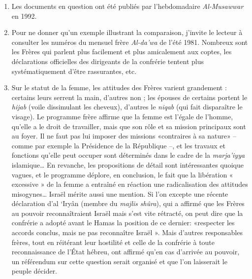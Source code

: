 \begin{enumerate}
\def\labelenumi{\arabic{enumi}.}
\setcounter{enumi}{43}
\item
   
  Les documents en question ont été publiés par l'hebdomadaire
  \emph{Al-Musawwar} en 1992.
   
\item
   
  Pour ne donner qu'un exemple illustrant la comparaison, j'invite le
  lecteur à consulter les numéros du mensuel frère \emph{Al-da'wa} de
  l'été 1981. Nombreux sont les Frères qui parlent plus facilement et
  plus amicalement aux coptes, les déclarations officielles des
  dirigeants de la confrérie tentent plus systématiquement d'être
  rassurantes, etc.
   
\item
   
  Sur le statut de la femme, les attitudes des Frères varient grandement
  : certains leurs serrent la main, d'autres non ; les épouses de
  certains portent le \emph{hijab} (voile dissimulant les cheveux),
  d'autres le \emph{niqab} (qui fait disparaître le visage). Le
  programme frère affirme que la femme est l'égale de l'homme, qu'elle a
  le droit de travailler, mais que son rôle et sa mission principaux
  sont au foyer. Il ne faut pas lui imposer des missions «contraires à
  sa nature» -- comme par exemple la Présidence de la République --, et
  les travaux et fonctions qu'elle peut occuper sont déterminés dans le
  cadre de la \emph{marja'iyya} islamique\ldots{} En revanche, les
  propositions de détail sont intéressantes quoique vagues, et le
  programme déplore, en conclusion, le fait que la libération «
  excessive » de la femme a entraîné en réaction une radicalisation des
  attitudes misogynes\ldots{} Israël mérite aussi une mention. Si l'on
  excepte une récente déclaration d'al `Iryân (membre du \emph{majlis
  shûra}), qui a affirmé que les Frères au pouvoir reconnaîtraient
  Israël mais s'est vite rétracté, on peut dire que la confrérie a
  adopté avant le Hamas la position de ce dernier: «respecter les
  accords conclus, mais ne pas reconnaître Israël ». Mais d'autres
  responsables frères, tout en réitérant leur hostilité et celle de la
  confrérie à toute reconnaissance de l'État hébreu, ont affirmé qu'en
  cas d'arrivée au pouvoir, un référendum sur cette question serait
  organisé et que l'on laisserait le peuple décider.
   
\end{enumerate}

